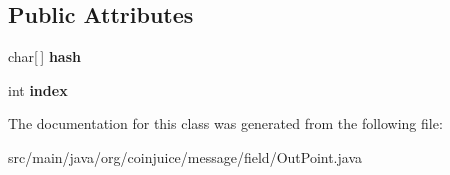 \subsection*{Public Attributes}
\begin{DoxyCompactItemize}
\item 
\hypertarget{classorg_1_1coinjuice_1_1message_1_1field_1_1_out_point_a771775834706487f3cc506602bb53428}{char\mbox{[}$\,$\mbox{]} {\bfseries hash}}\label{classorg_1_1coinjuice_1_1message_1_1field_1_1_out_point_a771775834706487f3cc506602bb53428}

\item 
\hypertarget{classorg_1_1coinjuice_1_1message_1_1field_1_1_out_point_a6641bc490f33149ecb92823aded058ec}{int {\bfseries index}}\label{classorg_1_1coinjuice_1_1message_1_1field_1_1_out_point_a6641bc490f33149ecb92823aded058ec}

\end{DoxyCompactItemize}


The documentation for this class was generated from the following file\-:\begin{DoxyCompactItemize}
\item 
src/main/java/org/coinjuice/message/field/Out\-Point.\-java\end{DoxyCompactItemize}
